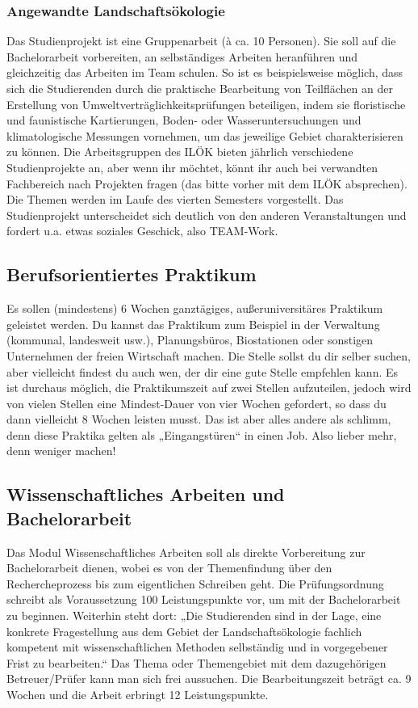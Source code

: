 \subsubsection*{Angewandte Landschaftsökologie}
Das Studienprojekt ist eine Gruppenarbeit (à ca. 10 Personen). Sie soll auf die Bachelorarbeit vorbereiten, an selbständiges Arbeiten heranführen und gleichzeitig das Arbeiten im Team schulen. So ist es beispielsweise möglich, dass sich die Studierenden durch die praktische Bearbeitung von Teilﬂächen an der Erstellung von Umweltverträglichkeitsprüfungen beteiligen, indem sie ﬂoristische und faunistische Kartierungen, Boden- oder Wasseruntersuchungen und klimatologische Messungen vornehmen, um das jeweilige Gebiet charakterisieren zu können. Die Arbeitsgruppen des ILÖK bieten jährlich verschiedene Studienprojekte an, aber wenn ihr möchtet, könnt ihr auch bei verwandten Fachbereich nach Projekten fragen (das bitte vorher mit dem ILÖK absprechen). Die Themen werden im Laufe des vierten Semesters vorgestellt. Das Studienprojekt unterscheidet sich deutlich von den anderen Veranstaltungen und fordert u.a. etwas soziales Geschick, also TEAM-Work.

\subsection*{Berufsorientiertes Praktikum}
Es sollen (mindestens) 6 Wochen ganztägiges, außeruniversitäres Praktikum geleistet werden. Du kannst das Praktikum zum Beispiel in der Verwaltung (kommunal, landesweit usw.), Planungsbüros, Biostationen oder sonstigen Unternehmen der freien Wirtschaft machen. Die Stelle sollst du dir selber suchen, aber vielleicht ﬁndest du auch wen, der dir eine gute Stelle empfehlen kann. Es ist durchaus möglich, die Praktikumszeit auf zwei Stellen aufzuteilen, jedoch wird von vielen Stellen eine Mindest-Dauer von vier Wochen gefordert, so dass du dann vielleicht 8 Wochen leisten musst. Das ist aber alles andere als schlimm, denn diese Praktika gelten als „Eingangstüren“ in einen Job. Also lieber mehr, denn weniger machen!

\subsection*{Wissenschaftliches Arbeiten und Bachelorarbeit}
Das Modul Wissenschaftliches Arbeiten soll als direkte Vorbereitung zur Bachelorarbeit dienen, wobei es von der Themenfindung über den Rechercheprozess bis zum eigentlichen Schreiben geht. Die Prüfungsordnung schreibt als Voraussetzung 100 Leistungspunkte vor, um mit der Bachelorarbeit zu beginnen. Weiterhin steht dort: „Die Studierenden sind in der Lage, eine konkrete Fragestellung aus dem Gebiet der Landschaftsökologie fachlich kompetent mit wissenschaftlichen Methoden selbständig und in vorgegebener Frist zu bearbeiten.“ Das Thema oder Themengebiet mit dem dazugehörigen Betreuer/Prüfer kann man sich frei aussuchen. Die Bearbeitungszeit beträgt ca. 9 Wochen und die Arbeit erbringt 12 Leistungspunkte.

